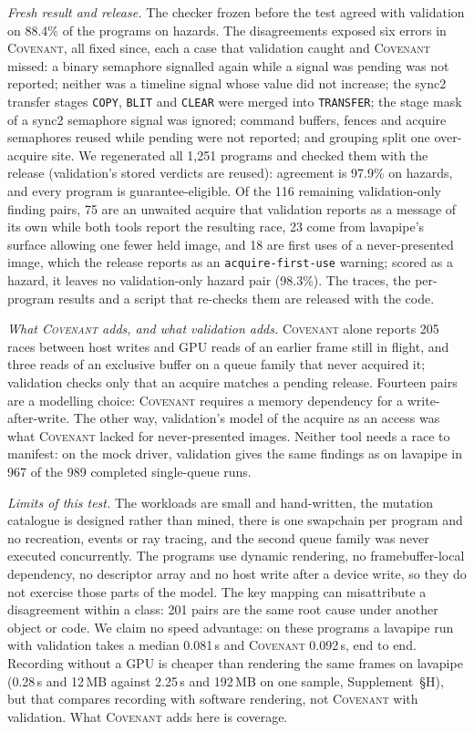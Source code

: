 \documentclass[acmtog,anonymous,review]{acmart}
\newcommand{\sys}{\textsc{Covenant}\xspace}
\newcommand{\code}[1]{\texttt{#1}}
\newcommand{\supp}[1]{Supplement~\S#1}
\begin{document}
\emph{Fresh result and release.} The checker frozen before the test agreed with validation on 88.4\% of the
programs on hazards. The disagreements exposed six errors in \sys, all fixed since, each a case that validation caught
and \sys missed: a binary semaphore signalled again while a signal was pending was not reported; neither was a
timeline signal whose value did not increase; the sync2 transfer stages \code{COPY}, \code{BLIT} and \code{CLEAR} were
merged into \code{TRANSFER}; the stage mask of a sync2 semaphore signal was ignored; command buffers, fences and acquire
semaphores reused while pending were not reported; and grouping split one over-acquire site. We regenerated all 1,251
programs and checked them with the release (validation's stored verdicts are reused): agreement is 97.9\% on hazards,
and every program is guarantee-eligible. Of the 116 remaining validation-only finding pairs, 75 are an unwaited
acquire that validation reports as a message of its own while both tools report the resulting race, 23 come from
lavapipe's surface allowing one fewer held image, and 18 are first uses of a never-presented image, which the release
reports as an \code{acquire-first-use} warning; scored as a hazard, it leaves no validation-only hazard pair (98.3\%).
The traces, the per-program results and a script that re-checks them are released with the code.

\emph{What \sys adds, and what validation adds.} \sys alone reports 205 races between host writes and GPU reads of an
earlier frame still in flight, and three reads of an exclusive buffer on a queue family that never acquired it;
validation checks only that an acquire matches a pending release. Fourteen pairs are a modelling choice: \sys
requires a memory dependency for a write-after-write. The other way, validation's model of the acquire as an access
was what \sys lacked for never-presented images. Neither tool needs a race to manifest: on the mock driver,
validation gives the same findings as on lavapipe in 967 of the 989 completed single-queue runs.

\emph{Limits of this test.} The workloads are small and hand-written, the mutation catalogue is designed rather than
mined, there is one swapchain per program and no recreation, events or ray tracing, and the second queue family was
never executed concurrently. The programs use dynamic rendering, no framebuffer-local dependency, no descriptor
array and no host write after a device write, so they do not exercise those parts of the model. The key mapping can misattribute a disagreement within a class: 201 pairs are the same
root cause under another object or code. We claim no speed advantage: on these programs a lavapipe run with validation
takes a median 0.081\,s and \sys 0.092\,s, end to end. Recording without a GPU is cheaper than rendering the same
frames on lavapipe (0.28\,s and 12\,MB against 2.25\,s and 192\,MB on one sample, \supp{H}), but that compares
recording with software rendering, not \sys with validation. What \sys adds here is coverage.
\end{document}
